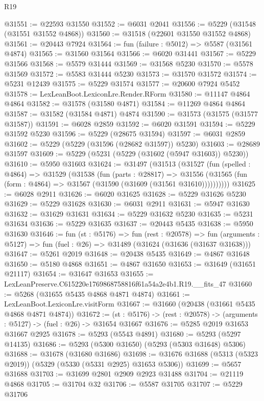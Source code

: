 \begin{lexlean}{R19}
\begin{coremodule}
@31551 := @22593 @31550
@31552 := @6031 @2041
@31556 := @5229 (@31548 (@31551 @31552 @4868))
@31560 := @31518 (@22601 @31550 @31552 @4868)
@31561 := @20443 @7924
@31564 := fun (failure : @5012) => @5587 (@31561 @4874)
@31565 := @31560 @31564
@31566 := @6020 @31441
@31567 := @5229 @31566
@31568 := @5579 @31444
@31569 := @31568 @5230
@31570 := @5578 @31569
@31572 := @5583 @31444 @5230
@31573 := @31570 @31572
@31574 := @5231 @12439
@31575 := @5229 @31574
@31577 := @20600 @7924 @5452
@31578 := LexLeanBoot.LexiconLre.Render.RForm
@31580 := @11147 @4864 @4864
@31582 := @31578 (@31580 @4871)
@31584 := @11269 @4864 @4864
@31587 := @31582 (@31584 @4871) @4874
@31590 := @31573 (@31575 (@31577 @31587))
@31591 := @6028 @2859
@31592 := @6020 @31591
@31594 := @5229 @31592 @5230
@31596 := @5229 (@28675 @31594)
@31597 := @6031 @2859
@31602 := @5229 (@5229 (@31596 (@28682 @31597)) @5230)
@31603 := @28689 @31597
@31609 := @5229 (@5231 (@5229 (@31602 (@5947 @31603)) @5230))
@31610 := @5950 @31603
@31624 := @31497
    (@31513
      (@31527
        (fun (spelled : @4864) =>
        @31529
          (@31538
            (fun (parts : @28817) =>
            @31556 (@31565 (fun (form : @4864) => @31567 (@31590 (@31609 (@31561 @31610))))))))))
@31625 := @6028 @2911
@31626 := @6020 @31625
@31628 := @5229 @31626 @5230
@31629 := @5229 @31628
@31630 := @6031 @2911
@31631 := @5947 @31630
@31632 := @31629 @31631
@31634 := @5229 @31632 @5230
@31635 := @5231 @31634
@31636 := @5229 @31635
@31637 := @20443 @5435
@31638 := @5950 @31630
@31646 := fun (st : @5176) =>
  fun (rest : @20578) =>
  fun (arguments : @5127) => fun (fuel : @26) => @31489 (@31624 (@31636 (@31637 @31638)))
@31647 := @5261 @2019
@31648 := @20438 @5435
@31649 := @4867 @31648
@31650 := @5180 @4868
@31651 := @4867 @31650
@31653 := @31649 (@31651 @21117)
@31654 := @31647 @31653
@31655 := LexLeanPreserve.C615220e1769868758816f61a54a2e4b1.R19.__fits_47
@31660 := @5268 (@31655 @5435 @4868 @4871 @4874)
@31661 := LexLeanBoot.LexiconLre.visitForm
@31667 := @31660 (@20438 (@31661 @5435 @4868 @4871 @4874))
@31672 := (st : @5176) -> (rest : @20578) -> (arguments : @5127) -> (fuel : @26) -> @31654 @31667
@31676 := @5285 @2019 @31653 @31667 @2925
@31678 := @5293 (@5543 @4891)
@31680 := @5293 (@5297 @14135)
@31686 := @5293 (@5300 @31650) (@5293 (@5303 @31648) @5306)
@31688 := @31678 (@31680 @31686)
@31698 := @31676 @31688 (@5313 (@5323 @2019)) (@5329 (@5330 (@5331 @2925) @31653 @5306))
@31699 := @5657 @31688
@31703 := @31699 @2801 @2909 @2923 @31488
@31704 := @21119 @4868
@31705 := @31704 @32
@31706 := @5587 @31705
@31707 := @5229 @31706

\end{coremodule}
\end{lexlean}
